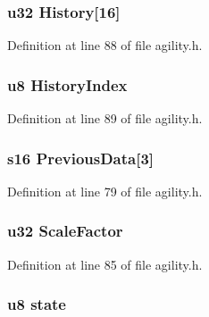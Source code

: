 \hypertarget{structagil_a9bbc4071e3512d3bbc55e6080ab105bb}{
\subsubsection[{\-History}]{\setlength{\rightskip}{0pt plus 5cm}u32 {\bf \-History}\mbox{[}16\mbox{]}}}\label{structagil_a9bbc4071e3512d3bbc55e6080ab105bb}


\-Definition at line 88 of file agility.\-h.

\hypertarget{structagil_a3b8a7ebc318db1dd3ccdfe5aae95a7d0}{
\subsubsection[{\-History\-Index}]{\setlength{\rightskip}{0pt plus 5cm}u8 {\bf \-History\-Index}}}\label{structagil_a3b8a7ebc318db1dd3ccdfe5aae95a7d0}


\-Definition at line 89 of file agility.\-h.

\hypertarget{structagil_abc2f303afac26d1a0b0c98c58f92c822}{
\subsubsection[{\-Previous\-Data}]{\setlength{\rightskip}{0pt plus 5cm}s16 {\bf \-Previous\-Data}\mbox{[}3\mbox{]}}}\label{structagil_abc2f303afac26d1a0b0c98c58f92c822}


\-Definition at line 79 of file agility.\-h.

\hypertarget{structagil_ac6c1d7ef12dbf33efe5a86a37e75caf4}{
\subsubsection[{\-Scale\-Factor}]{\setlength{\rightskip}{0pt plus 5cm}u32 {\bf \-Scale\-Factor}}}\label{structagil_ac6c1d7ef12dbf33efe5a86a37e75caf4}


\-Definition at line 85 of file agility.\-h.

\hypertarget{structagil_ad0bc4e4e6e6ffc52d9079b73afd73887}{
\subsubsection[{state}]{\setlength{\rightskip}{0pt plus 5cm}u8 {\bf state}}}\label{structagil_ad0bc4e4e6e6ffc52d9079b73afd73887}


